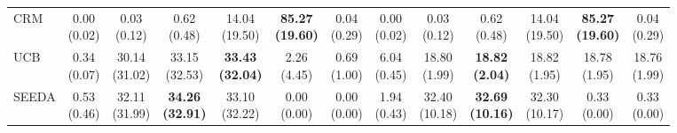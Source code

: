 {\begin{tabular}{l|cccccc|cccccc}
CRM & \makecell{0.00 \\ (0.02)} & {\cellcolor[HTML]{C8E6C9}} \makecell{0.03 \\ (0.12)} & \makecell{0.62 \\ (0.48)} & \makecell{14.04 \\ (19.50)} & \bfseries \makecell{85.27 \\ (19.60)} & \makecell{0.04 \\ (0.29)} & \makecell{0.00 \\ (0.02)} & {\cellcolor[HTML]{C8E6C9}} \makecell{0.03 \\ (0.12)} & \makecell{0.62 \\ (0.48)} & \makecell{14.04 \\ (19.50)} & \bfseries \makecell{85.27 \\ (19.60)} & \makecell{0.04 \\ (0.29)} \\
UCB & \makecell{0.34 \\ (0.07)} & {\cellcolor[HTML]{C8E6C9}} \makecell{30.14 \\ (31.02)} & \makecell{33.15 \\ (32.53)} & \bfseries \makecell{33.43 \\ (32.04)} & \makecell{2.26 \\ (4.45)} & \makecell{0.69 \\ (1.00)} & \makecell{6.04 \\ (0.45)} & {\cellcolor[HTML]{C8E6C9}} \makecell{18.80 \\ (1.99)} & \bfseries \makecell{18.82 \\ (2.04)} & \makecell{18.82 \\ (1.95)} & \makecell{18.78 \\ (1.95)} & \makecell{18.76 \\ (1.99)} \\
SEEDA & \makecell{0.53 \\ (0.46)} & {\cellcolor[HTML]{C8E6C9}} \makecell{32.11 \\ (31.99)} & \bfseries \makecell{34.26 \\ (32.91)} & \makecell{33.10 \\ (32.22)} & \makecell{0.00 \\ (0.00)} & \makecell{0.00 \\ (0.00)} & \makecell{1.94 \\ (0.43)} & {\cellcolor[HTML]{C8E6C9}} \makecell{32.40 \\ (10.18)} & \bfseries \makecell{32.69 \\ (10.16)} & \makecell{32.30 \\ (10.17)} & \makecell{0.33 \\ (0.00)} & \makecell{0.33 \\ (0.00)} \\

\end{tabular}}

